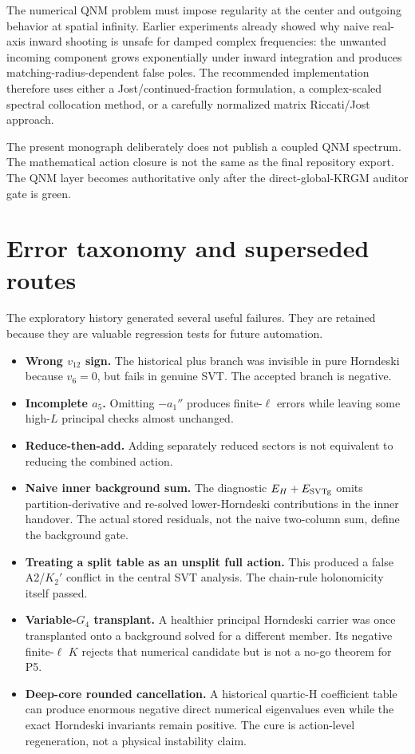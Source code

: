 \documentclass[11pt,a4paper,oneside]{book}
\begin{document}
The numerical QNM problem must impose regularity at the center and outgoing behavior at spatial infinity. Earlier experiments already showed why naive real-axis inward shooting is unsafe for damped complex frequencies: the unwanted incoming component grows exponentially under inward integration and produces matching-radius-dependent false poles. The recommended implementation therefore uses either a Jost/continued-fraction formulation, a complex-scaled spectral collocation method, or a carefully normalized matrix Riccati/Jost approach.

The present monograph deliberately does not publish a coupled QNM spectrum. The mathematical action closure is not the same as the final repository export. The QNM layer becomes authoritative only after the direct-global-KRGM auditor gate is green.

\chapter{Error taxonomy and superseded routes}
The exploratory history generated several useful failures. They are retained because they are valuable regression tests for future automation.

\begin{itemize}
\item \textbf{Wrong $v_{12}$ sign.} The historical plus branch was invisible in pure Horndeski because $v_6=0$, but fails in genuine SVT. The accepted branch is negative.
\item \textbf{Incomplete $a_5$.} Omitting $-a_1''$ produces finite-$\ell$ errors while leaving some high-$L$ principal checks almost unchanged.
\item \textbf{Reduce-then-add.} Adding separately reduced sectors is not equivalent to reducing the combined action.
\item \textbf{Naive inner background sum.} The diagnostic $E_H+E_{\rm SVTg}$ omits partition-derivative and re-solved lower-Horndeski contributions in the inner handover. The actual stored residuals, not the naive two-column sum, define the background gate.
\item \textbf{Treating a split table as an unsplit full action.} This produced a false A2/$K_2'$ conflict in the central SVT analysis. The chain-rule holonomicity itself passed.
\item \textbf{Variable-$G_4$ transplant.} A healthier principal Horndeski carrier was once transplanted onto a background solved for a different member. Its negative finite-$\ell$ $K$ rejects that numerical candidate but is not a no-go theorem for P5.
\item \textbf{Deep-core rounded cancellation.} A historical quartic-H coefficient table can produce enormous negative direct numerical eigenvalues even while the exact Horndeski invariants remain positive. The cure is action-level regeneration, not a physical instability claim.
\end{itemize}
\end{document}
